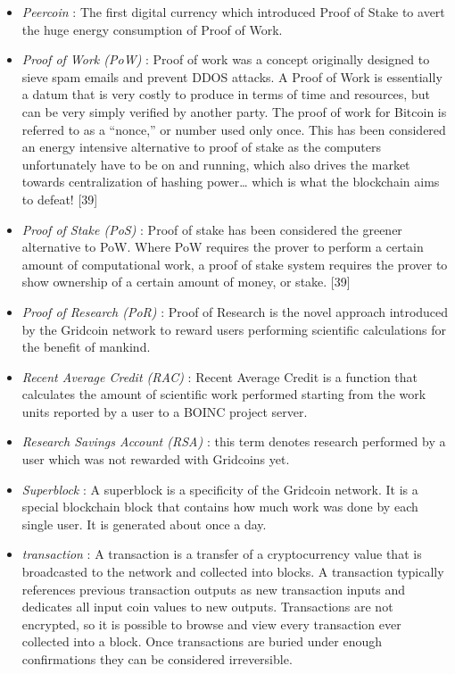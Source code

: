 \begin{itemize}
  \item \textit{Peercoin} : The first digital currency which introduced Proof of Stake to avert the huge energy consumption of Proof of Work.
  \item \textit{Proof of Work (PoW)} : Proof of work was a concept originally designed to sieve spam emails and prevent DDOS attacks. A Proof of Work is essentially a datum that is very costly to produce in terms of time and resources, but can be very simply verified by another party. The proof of work for Bitcoin is referred to as a “nonce,” or number used only once. This has been considered an energy intensive alternative to proof of stake as the computers unfortunately have to be on and running, which also drives the market towards centralization of hashing power… which is what the blockchain aims to defeat! [39]
  \item \textit{Proof of Stake (PoS)} : Proof of stake has been considered the greener alternative to PoW. Where PoW requires the prover to perform a certain amount of computational work, a proof of stake system requires the prover to show ownership of a certain amount of money, or stake. [39]
  \item \textit{Proof of Research (PoR)} : Proof of Research is the novel approach introduced by the Gridcoin network to reward users performing scientific calculations for the benefit of mankind.
  \item \textit{Recent Average Credit (RAC)} : Recent Average Credit is a function that calculates the amount of scientific work performed starting from the work units reported by a user to a BOINC project server.
  \item \textit{Research Savings Account (RSA)} : this term denotes research performed by a user which was not rewarded with Gridcoins yet.
  \item \textit{Superblock} : A superblock is a specificity of the Gridcoin network. It is a special blockchain block that contains how much work was done by each single user. It is generated about once a day.
  \item \textit{transaction} : A transaction is a transfer of a cryptocurrency value that is broadcasted to the network and collected into blocks. A transaction typically references previous transaction outputs as new transaction inputs and dedicates all input coin values to new outputs. Transactions are not encrypted, so it is possible to browse and view every transaction ever collected into a block. Once transactions are buried under enough confirmations they can be considered irreversible.\\

\end{itemize}
